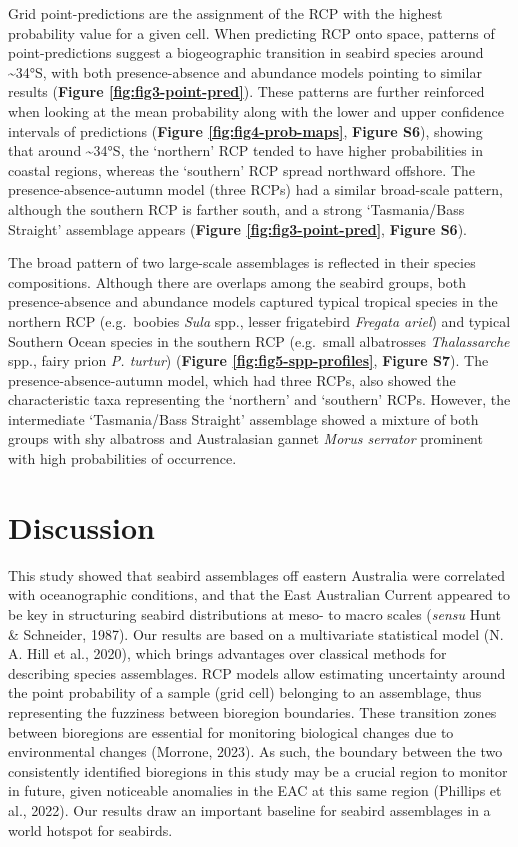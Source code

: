 \documentclass{article}
\begin{document}
Grid point-predictions are the assignment of the RCP with the highest probability value for a given cell. When predicting RCP onto space, patterns of point-predictions suggest a biogeographic transition in seabird species around \textasciitilde34°S, with both presence-absence and abundance models pointing to similar results (\textbf{Figure \ref{fig:fig3-point-pred}}). These patterns are further reinforced when looking at the mean probability along with the lower and upper confidence intervals of predictions (\textbf{Figure \ref{fig:fig4-prob-maps}}, \textbf{Figure S6}), showing that around \textasciitilde34°S, the `northern' RCP tended to have higher probabilities in coastal regions, whereas the `southern' RCP spread northward offshore. The presence-absence-autumn model (three RCPs) had a similar broad-scale pattern, although the southern RCP is farther south, and a strong `Tasmania/Bass Straight' assemblage appears (\textbf{Figure \ref{fig:fig3-point-pred}}, \textbf{Figure S6}).

The broad pattern of two large-scale assemblages is reflected in their species compositions. Although there are overlaps among the seabird groups, both presence-absence and abundance models captured typical tropical species in the northern RCP (e.g.~boobies \emph{Sula} spp., lesser frigatebird \emph{Fregata ariel}) and typical Southern Ocean species in the southern RCP (e.g.~small albatrosses \emph{Thalassarche} spp., fairy prion \emph{P. turtur}) (\textbf{Figure \ref{fig:fig5-spp-profiles}}, \textbf{Figure S7}). The presence-absence-autumn model, which had three RCPs, also showed the characteristic taxa representing the `northern' and `southern' RCPs. However, the intermediate `Tasmania/Bass Straight' assemblage showed a mixture of both groups with shy albatross and Australasian gannet \emph{Morus serrator} prominent with high probabilities of occurrence.

\hypertarget{discussion}{%
\section{Discussion}\label{discussion}}

This study showed that seabird assemblages off eastern Australia were correlated with oceanographic conditions, and that the East Australian Current appeared to be key in structuring seabird distributions at meso- to macro scales (\emph{sensu} Hunt \& Schneider, 1987). Our results are based on a multivariate statistical model (N. A. Hill et al., 2020), which brings advantages over classical methods for describing species assemblages. RCP models allow estimating uncertainty around the point probability of a sample (grid cell) belonging to an assemblage, thus representing the fuzziness between bioregion boundaries. These transition zones between bioregions are essential for monitoring biological changes due to environmental changes (Morrone, 2023). As such, the boundary between the two consistently identified bioregions in this study may be a crucial region to monitor in future, given noticeable anomalies in the EAC at this same region (Phillips et al., 2022). Our results draw an important baseline for seabird assemblages in a world hotspot for seabirds.
\end{document}
